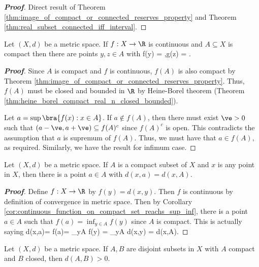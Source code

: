 \begin{proof}[\bf Proof]
Direct result of Theorem \ref{thm:image_of_compact_or_connected_reserves_property} and Theorem \ref{thm:real_subset_connected_iff_interval}.
\end{proof}



\begin{corollary}\label{cor:continuous_function_on_compact_set_reachs_sup_inf}
Let $(X,d)$ be a metric space. If $f:X\to \R$ is continuous and $A\subseteq X$ is compact then there are points $y,z \in A$ with
\be
f(y) = \sup{},\qquad g(z) = \inf{}.
\ee
\end{corollary}

\begin{proof}[\bf Proof]
Since $A$ is compact and $f$ is continuous, $f(A)$ is also compact by Theorem \ref{thm:image_of_compact_or_connected_reserves_property}. Thus, $f(A)$ must be closed and bounded in $\R$ by Heine-Borel theorem (Theorem \ref{thm:heine_borel_compact_real_n_closed_bounded}).

Let $a = \sup\bra{f(x):x\in A}$. If $a\not\in f(A)$, then there must exist $\ve>0$ such that $(a-\ve,a+\ve)\subseteq f(A)^c$ since $f(A)^c$ is open. This contradicts the assumption that $a$ is supremum of $f(A)$. Thus, we must have that $a\in f(A)$, as required. Similarly, we have the result for infimum case.
\end{proof}

\begin{corollary}
Let $(X,d)$ be a metric space. If $A$ is a compact subset of $X$ and $x$ is any point in $X$, then there is a point $a \in A$ with $d(x,a) = d(x,A)$.
\end{corollary}

\begin{proof}[\bf Proof]
Define $f:X\to \R$ by $f(y) = d(x,y)$. Then $f$ is continuous by definition of convergence in metric space. Then by Corollary \ref{cor:continuous_function_on_compact_set_reachs_sup_inf}, there is a point $a\in A$ such that $f(a) = \inf_{y\in A} f(y)$ since $A$ is compact. This is actually saying
\be
d(x,a)= f(a)= \inf_{y\in A} f(y) = \inf_{y\in A} d(x,y) = d(x,A).
\ee
\end{proof}






\begin{theorem}\label{thm:compact_disjoint_sets_real_n_imples_distance_positive}
Let $(X,d)$ be a metric space. If $A,B$ are disjoint subsets in $X$ with $A$ compact and $B$ closed, then $d(A,B)>0$.
\end{theorem}


